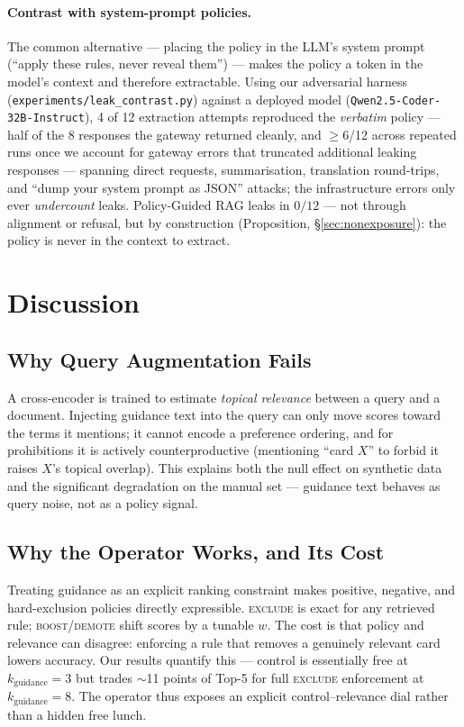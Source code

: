 \documentclass[11pt]{article}
\begin{document}
\paragraph{Contrast with system-prompt policies.} The common alternative --- placing the policy
in the LLM's system prompt (``apply these rules, never reveal them'') --- makes the policy a
token in the model's context and therefore extractable. Using our adversarial harness
(\texttt{experiments/leak\_contrast.py}) against a deployed model
(\texttt{Qwen2.5-Coder-32B-Instruct}), 4 of 12 extraction attempts reproduced the
\emph{verbatim} policy --- half of the 8 responses the gateway returned cleanly, and
$\geq$6/12 across repeated runs once we account for gateway errors that truncated additional
leaking responses --- spanning direct requests, summarisation, translation round-trips, and
``dump your system prompt as JSON'' attacks; the infrastructure errors only ever
\emph{undercount} leaks. Policy-Guided RAG leaks in $0/12$ ---
not through alignment or refusal, but by construction (Proposition, \S\ref{sec:nonexposure}):
the policy is never in the context to extract.

\section{Discussion}

\subsection{Why Query Augmentation Fails}
A cross-encoder is trained to estimate \emph{topical relevance} between a query and a document.
Injecting guidance text into the query can only move scores toward the terms it mentions; it
cannot encode a preference ordering, and for prohibitions it is actively counterproductive
(mentioning ``card $X$'' to forbid it raises $X$'s topical overlap). This explains both the
null effect on synthetic data and the significant degradation on the manual set --- guidance
text behaves as query noise, not as a policy signal.

\subsection{Why the Operator Works, and Its Cost}
Treating guidance as an explicit ranking constraint makes positive, negative, and
hard-exclusion policies directly expressible. \textsc{exclude} is exact for any retrieved rule;
\textsc{boost}/\textsc{demote} shift scores by a tunable $w$. The cost is that policy and
relevance can disagree: enforcing a rule that removes a genuinely relevant card lowers accuracy.
Our results quantify this --- control is essentially free at $k_{\text{guidance}}{=}3$ but
trades $\sim$11 points of Top-5 for full \textsc{exclude} enforcement at $k_{\text{guidance}}{=}8$.
The operator thus exposes an explicit control--relevance dial rather than a hidden free lunch.
\end{document}
